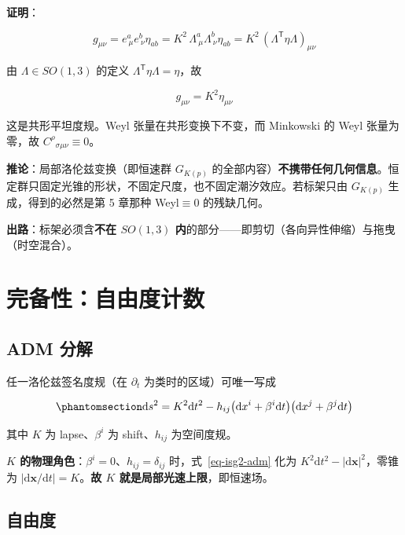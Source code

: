 \documentclass[
  chinese,
  a4paper,
  UTF8,
  12pt,
  oneside,
  openany]{ctexbook}
\theoremstyle{plain}
\theoremstyle{plain}
\theoremstyle{plain}
\theoremstyle{definition}
\theoremstyle{plain}
\theoremstyle{plain}
\theoremstyle{remark}
\begin{document}
\textbf{证明}：

\[
g_{\mu\nu}=e^{a}_{\ \mu}e^{b}_{\ \nu}\eta_{ab}
=K^{2}\,\Lambda^{a}_{\ \mu}\Lambda^{b}_{\ \nu}\eta_{ab}
=K^{2}\,(\Lambda^{\mathsf{T}}\eta\Lambda)_{\mu\nu}
\]

由 \(\Lambda\in SO(1,3)\) 的定义
\(\Lambda^{\mathsf{T}}\eta\Lambda=\eta\)，故

\[
g_{\mu\nu}=K^{2}\eta_{\mu\nu}
\]

这是共形平坦度规。Weyl 张量在共形变换下不变，而 Minkowski 的 Weyl
张量为零，故 \(C^{\rho}{}_{\sigma\mu\nu}\equiv0\)。

\textbf{推论}：局部洛伦兹变换（即恒速群 \(G_{K(p)}\)
的全部内容）\textbf{不携带任何几何信息}。恒定群只固定光锥的形状，不固定尺度，也不固定潮汐效应。若标架只由
\(G_{K(p)}\) 生成，得到的必然是第 5 章那种 Weyl\(\equiv0\) 的残缺几何。

\textbf{出路}：标架必须含\textbf{不在 \(SO(1,3)\)
内}的部分------即剪切（各向异性伸缩）与拖曳（时空混合）。

\section{完备性：自由度计数}\label{sec-isg2-dof}

\subsection{ADM 分解}\label{adm-ux5206ux89e3}

任一洛伦兹签名度规（在 \(\partial_t\) 为类时的区域）可唯一写成

\begin{equation}\protect\phantomsection\label{eq-isg2-adm}{
\mathrm{d}s^{2}=K^{2}\mathrm{d}t^{2}
-h_{ij}\bigl(\mathrm{d}x^{i}+\beta^{i}\mathrm{d}t\bigr)\bigl(\mathrm{d}x^{j}+\beta^{j}\mathrm{d}t\bigr)
}\end{equation}

其中 \(K\) 为 lapse、\(\beta^{i}\) 为 shift、\(h_{ij}\) 为空间度规。

\textbf{\(K\) 的物理角色}：\(\beta^{i}=0\)、\(h_{ij}=\delta_{ij}\)
时，式~\ref{eq-isg2-adm} 化为
\(K^{2}\mathrm{d}t^{2}-\lvert\mathrm{d}\mathbf{x}\rvert^{2}\)，零锥为
\(\lvert\mathrm{d}\mathbf{x}/\mathrm{d}t\rvert=K\)。\textbf{故 \(K\)
就是局部光速上限}，即恒速场。

\subsection{自由度}\label{ux81eaux7531ux5ea6}
\end{document}
